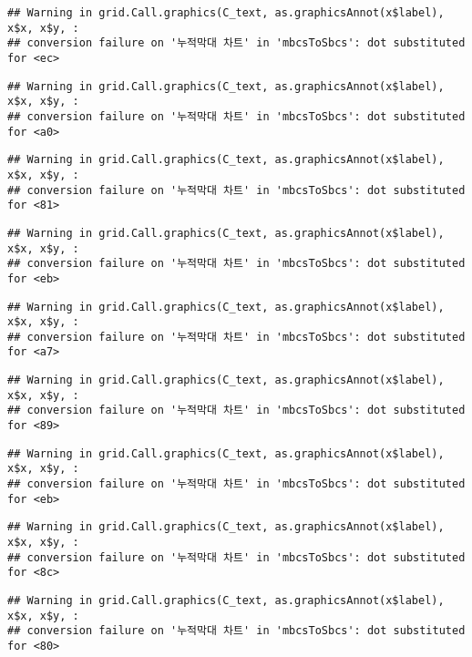 \documentclass[
]{article}
\begin{document}
\begin{verbatim}
## Warning in grid.Call.graphics(C_text, as.graphicsAnnot(x$label), x$x, x$y, :
## conversion failure on '누적막대 차트' in 'mbcsToSbcs': dot substituted for <ec>
\end{verbatim}

\begin{verbatim}
## Warning in grid.Call.graphics(C_text, as.graphicsAnnot(x$label), x$x, x$y, :
## conversion failure on '누적막대 차트' in 'mbcsToSbcs': dot substituted for <a0>
\end{verbatim}

\begin{verbatim}
## Warning in grid.Call.graphics(C_text, as.graphicsAnnot(x$label), x$x, x$y, :
## conversion failure on '누적막대 차트' in 'mbcsToSbcs': dot substituted for <81>
\end{verbatim}

\begin{verbatim}
## Warning in grid.Call.graphics(C_text, as.graphicsAnnot(x$label), x$x, x$y, :
## conversion failure on '누적막대 차트' in 'mbcsToSbcs': dot substituted for <eb>
\end{verbatim}

\begin{verbatim}
## Warning in grid.Call.graphics(C_text, as.graphicsAnnot(x$label), x$x, x$y, :
## conversion failure on '누적막대 차트' in 'mbcsToSbcs': dot substituted for <a7>
\end{verbatim}

\begin{verbatim}
## Warning in grid.Call.graphics(C_text, as.graphicsAnnot(x$label), x$x, x$y, :
## conversion failure on '누적막대 차트' in 'mbcsToSbcs': dot substituted for <89>
\end{verbatim}

\begin{verbatim}
## Warning in grid.Call.graphics(C_text, as.graphicsAnnot(x$label), x$x, x$y, :
## conversion failure on '누적막대 차트' in 'mbcsToSbcs': dot substituted for <eb>
\end{verbatim}

\begin{verbatim}
## Warning in grid.Call.graphics(C_text, as.graphicsAnnot(x$label), x$x, x$y, :
## conversion failure on '누적막대 차트' in 'mbcsToSbcs': dot substituted for <8c>
\end{verbatim}

\begin{verbatim}
## Warning in grid.Call.graphics(C_text, as.graphicsAnnot(x$label), x$x, x$y, :
## conversion failure on '누적막대 차트' in 'mbcsToSbcs': dot substituted for <80>
\end{verbatim}
\end{document}
